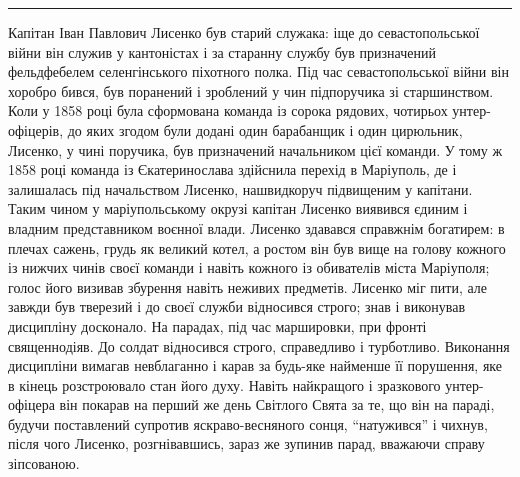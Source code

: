 \documentclass[a4paper,20pt]{report}
\begin{document}
\par\noindent\rule{\textwidth}{0.4pt}
Капітан Іван Павлович Лисенко був старий служака: іще до севастопольської війни
він служив у кантоністах і за старанну службу був призначений фельдфебелем селенгінського піхотного полка.
Під час севастопольської війни він хоробро бився, був поранений і зроблений у чин
підпоручика зі старшинством. Коли у 1858 році була сформована команда із сорока рядових, чотирьох унтер-офіцерів,
до яких згодом були додані один барабанщик і один цирюльник, Лисенко, у чині поручика, був призначений начальником цієї команди.
У тому ж 1858 році команда із Єкатеринослава здійснила перехід в Маріуполь,
де і залишалась під начальством Лисенко, нашвидкоруч підвищеним у капітани. Таким чином у маріупольському окрузі
капітан Лисенко виявився єдиним і владним представником воєнної влади. Лисенко здавався справжнім богатирем: 
в плечах сажень, грудь як великий котел, а ростом він був вище на голову кожного із нижчих чинів своєї команди
і навіть кожного із обивателів міста Маріуполя; голос його визивав збурення навіть неживих предметів. Лисенко міг пити,
але завжди був тверезий і до своєї служби відносився строго; знав і виконував дисципліну досконало. На парадах,
під час маршировки, при фронті священнодіяв. До солдат відносився строго, справедливо і турботливо. Виконання дисципліни
вимагав невблаганно і карав за будь-яке найменше її порушення, яке в кінець розстроювало стан його духу. Навіть найкращого і 
зразкового унтер-офіцера він покарав на перший же день Світлого Свята за те, що він на параді, будучи поставлений
супротив яскраво-весняного сонця, ``натужився'' і чихнув, після чого Лисенко, розгнівавшись, зараз же 
зупинив парад, вважаючи справу зіпсованою.
\end{document}
